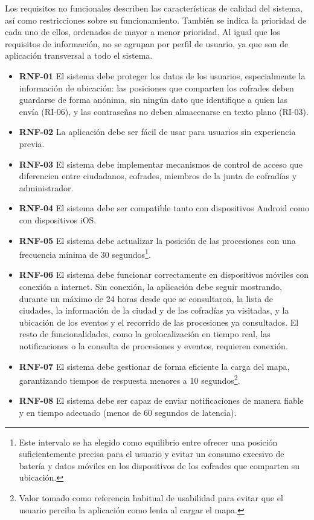 Los requisitos no funcionales describen las características de calidad del sistema, así como restricciones sobre su funcionamiento. También se indica la prioridad de cada uno de ellos, ordenados de mayor a menor prioridad. Al igual que los requisitos de información, no se agrupan por perfil de usuario, ya que son de aplicación transversal a todo el sistema.

\begin{itemize}
    \item \textbf{RNF-01}  El sistema debe proteger los datos de los usuarios, especialmente la información de ubicación: las posiciones que comparten los cofrades deben guardarse de forma anónima, sin ningún dato que identifique a quien las envía (RI-06), y las contraseñas no deben almacenarse en texto plano (RI-03).

    \item \textbf{RNF-02}  La aplicación debe ser fácil de usar para usuarios sin experiencia previa.

    \item \textbf{RNF-03}  El sistema debe implementar mecanismos de control de acceso que diferencien entre ciudadanos, cofrades, miembros de la junta de cofradías y administrador.

    \item \textbf{RNF-04}  El sistema debe ser compatible tanto con dispositivos Android como con dispositivos iOS.

    \item \textbf{RNF-05}  El sistema debe actualizar la posición de las procesiones con una frecuencia mínima de 30 segundos\footnote{Este intervalo se ha elegido como equilibrio entre ofrecer una posición suficientemente precisa para el usuario y evitar un consumo excesivo de batería y datos móviles en los dispositivos de los cofrades que comparten su ubicación.}.

    \item \textbf{RNF-06}  El sistema debe funcionar correctamente en dispositivos móviles con conexión a internet. Sin conexión, la aplicación debe seguir mostrando, durante un máximo de 24 horas desde que se consultaron, la lista de ciudades, la información de la ciudad y de las cofradías ya visitadas, y la ubicación de los eventos y el recorrido de las procesiones ya consultados. El resto de funcionalidades, como la geolocalización en tiempo real, las notificaciones o la consulta de procesiones y eventos, requieren conexión.

    \item \textbf{RNF-07}  El sistema debe gestionar de forma eficiente la carga del mapa, garantizando tiempos de respuesta menores a 10 segundos\footnote{Valor tomado como referencia habitual de usabilidad para evitar que el usuario perciba la aplicación como lenta al cargar el mapa.}.

    \item \textbf{RNF-08}  El sistema debe ser capaz de enviar notificaciones de manera fiable y en tiempo adecuado (menos de 60 segundos de latencia).
\end{itemize}
